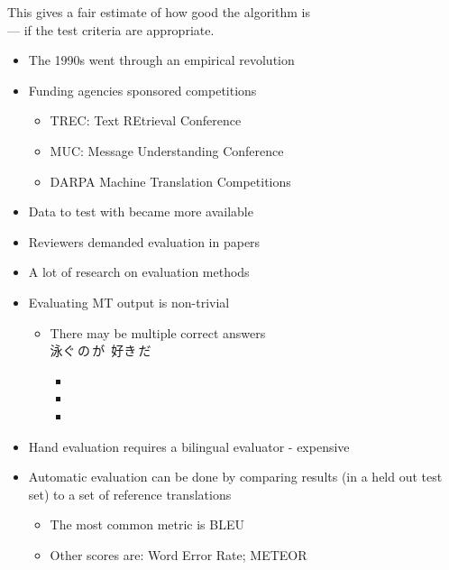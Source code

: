\documentclass[a4paper,landscape,headrule,footrule,dvips]{foils}
\begin{document}
\begin{CJK}{UTF8}{min}
This gives a fair estimate of how good the algorithm is 
\\ --- if the test criteria are appropriate.


  \begin{itemize}
  \item The 1990s went through an empirical revolution
  \item Funding agencies sponsored competitions
    \begin{itemize}
    \item TREC: Text REtrieval Conference
    \item MUC: Message Understanding Conference
    \item DARPA Machine Translation Competitions
    \end{itemize}
  \item Data to test with became more available
  \item Reviewers demanded evaluation in papers
  \item A lot of research on evaluation methods
  \end{itemize}



\begin{itemize}
\item Evaluating MT output is non-trivial
  \begin{itemize}
  \item There may be multiple correct answers 
    \\ 泳ぐ\,の\,が\ 好き\,だ 
    \begin{itemize}
    \item {}
    \item {}
    \item {}
    \end{itemize}
  \end{itemize}
\item Hand evaluation requires a bilingual evaluator - expensive
\item Automatic evaluation can be done by comparing results (in a held
  out test  set) to a set of reference translations
  \begin{itemize}
  \item The most common metric is BLEU 
  \item Other scores are: Word Error Rate; METEOR
  \end{itemize}
\end{itemize}




\end{CJK}
\end{document}
